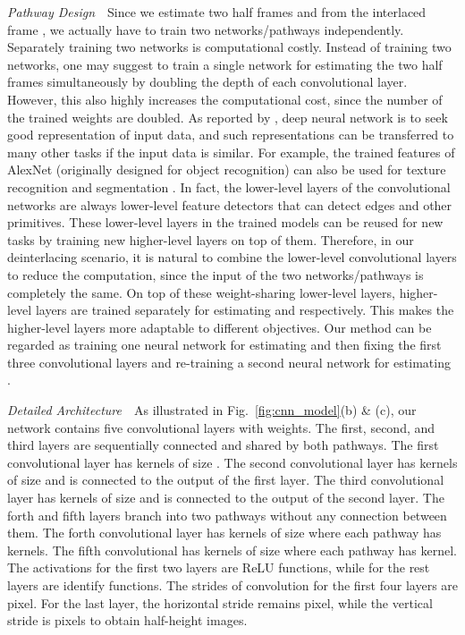 \documentclass[acmtog]{acmart}
\begin{document}
\vspace{0.15in}
\noindent\emph{Pathway Design}\,\,\,\,
Since we estimate two half frames  and
 from the interlaced frame , we
actually have to train two networks/pathways independently. Separately training two
networks is computational costly. Instead of training two networks, one
may suggest to train a single network for estimating the two half frames simultaneously
by doubling the depth of each convolutional layer. However, this also
highly increases the computational cost, since the number of the trained weights
are doubled. As reported by \cite{bengio2012deep}, deep neural network is to
seek good representation of input data, and such representations can be transferred
to many other tasks if the input data is similar. For example, the trained
features of AlexNet \cite{krizhevsky2012imagenet} (originally designed for
object recognition) can also be used for texture recognition and segmentation
\cite{cimpoi2015deep}. In fact, the lower-level layers of the convolutional
networks are always lower-level feature detectors that can detect edges and other
primitives. These lower-level layers in the trained models can be reused for new
tasks by training new higher-level layers on top of them. Therefore, in our
deinterlacing scenario, it is natural to combine the lower-level convolutional
layers to reduce the computation, since the input of the two networks/pathways is
completely the same. On top of these weight-sharing lower-level layers, higher-level 
layers are trained separately for estimating 
and  respectively. This makes the 
higher-level layers more adaptable to different objectives. Our method can be regarded
as training one neural network for estimating  and
then fixing the first three convolutional layers and re-training a second neural
network for estimating .



\vspace{0.15in}
\noindent\emph{Detailed Architecture}\,\,\,\,
As illustrated in Fig.~\ref{fig:cnn_model}(b) \& (c), our network contains five convolutional layers with weights.
The first, second, and third layers are sequentially connected and shared by both pathways.
The first convolutional layer has  kernels of size .
The second convolutional layer has  kernels of size  and is connected to the output of the first layer.
The third convolutional layer has  kernels of size  and is connected to the output of the second layer.
The forth and fifth layers branch into two pathways without any connection between them.
The forth convolutional layer has  kernels of size  where each pathway has  kernels.
The fifth convolutional has  kernels of size  where each pathway has  kernel.
The activations for the first two layers are ReLU functions, while for the rest layers are identify functions.
The strides of convolution for the first four layers are  pixel.
For the last layer, the horizontal stride remains  pixel, while the vertical stride is  pixels to obtain half-height images.
\end{document}
